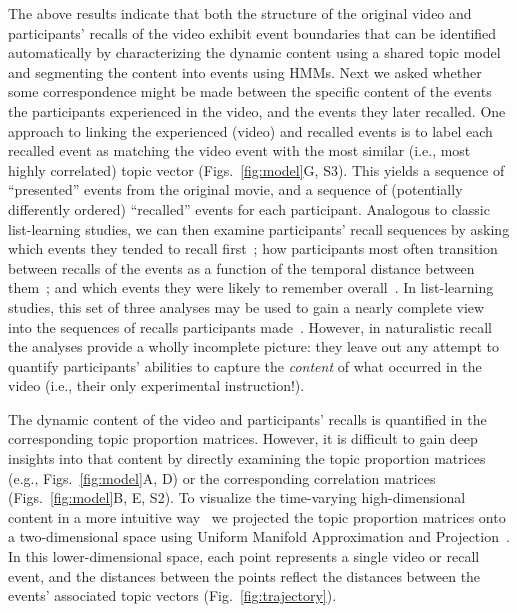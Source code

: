 \documentclass{article}
\newcommand{\corrmats}{S2}
\newcommand{\matchmats}{S3}
\newcommand{\listlearning}{S5}
\begin{document}
The above results indicate that both the structure of the original video and participants' recalls of the video exhibit event boundaries that can be identified automatically by characterizing the dynamic content using a shared topic model and segmenting the content into events using HMMs.  Next we asked whether some correspondence might be made between the specific content of the events the participants experienced in the video, and the events they later recalled.  One approach to linking the experienced (video) and recalled events is to label each recalled event as matching the video event with the most similar (i.e., most highly correlated) topic vector (Figs.~\ref{fig:model}G, \matchmats).  This yields a sequence of ``presented'' events from the original movie, and a sequence of (potentially differently ordered) ``recalled'' events for each participant.  Analogous to classic list-learning studies, we can then examine participants' recall sequences by asking which events they tended to recall first~\citep[e.g., probability of first recall; Fig.~\listlearning A; ][]{WelcBurn24, PostPhil65, AtkiShif68}; how participants most often transition between recalls of the events as a function of the temporal distance between them~\citep[e.g., lag-conditional response probability; Fig.~\listlearning B; ][]{Kaha96}; and which events they were likely to remember overall~\citep[e.g., serial position recall analyses; Fig.~\listlearning C; ][]{Murd62a}.  In list-learning studies, this set of three analyses may be used to gain a nearly complete view into the sequences of recalls participants made~\citep[e.g., ][]{Kaha12}.  However, in naturalistic recall the analyses provide a wholly incomplete picture: they leave out any attempt to quantify participants' abilities to capture the \textit{content} of what occurred in the video (i.e., their only experimental instruction!).

The dynamic content of the video and participants' recalls is quantified in the corresponding topic proportion matrices.  However, it is difficult to gain deep insights into that content by directly examining the topic proportion matrices (e.g., Figs.~\ref{fig:model}A, D) or the corresponding correlation matrices (Figs.~\ref{fig:model}B, E, \corrmats).  To visualize the time-varying high-dimensional content in a more intuitive way~\citep{HeusEtal18} we projected the topic proportion matrices onto a two-dimensional space using Uniform Manifold Approximation and Projection~\citep[UMAP; ][]{McInHeal18}.  In this lower-dimensional space, each point represents a single video or recall event, and the distances between the points reflect the distances between the events' associated topic vectors (Fig.~\ref{fig:trajectory}).
\end{document}
